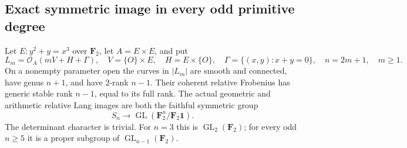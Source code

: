 \subsection{Exact symmetric image in every odd primitive degree}

\begin{theorem}
\label{thm:root-all-odd-double-cover-symmetric-image}
Let \(E:y^2+y=x^3\) over \(\mathbf F_2\), let
\(A=E\times E\), and put
\[
 L_m=\mathcal O_A(mV+H+\Gamma),\quad
 V=\{O\}\times E,\quad H=E\times\{O\},\quad
 \Gamma=\{(x,y):x+y=0\},\quad n=2m+1,\quad m\ge1.
\]
On a nonempty parameter open the curves in \(|L_m|\) are
smooth and connected, have genus \(n+1\), and have
\(2\)-rank \(n-1\). Their coherent relative Frobenius has
generic stable rank \(n-1\), equal to its full rank.
The actual geometric and arithmetic relative Lang images are
both the faithful symmetric group
\[
 S_n\longrightarrow\operatorname{GL}
       (\mathbf F_2^n/\mathbf F_2\mathbf1).
\]
The determinant character is trivial. For \(n=3\) this is
\(\operatorname{GL}_2(\mathbf F_2)\); for every odd
\(n\ge5\) it is a proper subgroup of
\(\operatorname{GL}_{n-1}(\mathbf F_2)\).
\end{theorem}
